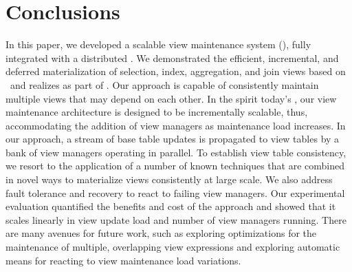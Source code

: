 \section{Conclusions}
\label{sec:conclusion}

In this paper, we developed a scalable view maintenance system (\VMS),
fully integrated with a distributed \KVS. We demonstrated the
efficient, incremental, and deferred materialization of selection,
index, aggregation, and join views based on \VMS\ and realizes as part
of \HB. Our approach is capable of consistently maintain multiple
views that may depend on each other.  In the spirit today's \KVSs, our
view maintenance architecture is designed to be incrementally
scalable, thus, accommodating the addition of view managers as
maintenance load increases. In our approach, a stream of base table
updates is propagated to view tables by a bank of view managers
operating in parallel. To establish view table consistency, we resort
to the application of a number of known techniques that are combined
in novel ways to materialize views consistently at large scale. We
also address fault tolerance and recovery to react to failing view
managers. Our experimental evaluation quantified the benefits and cost
of the approach and showed that it scales linearly in view update load
and number of view managers running. There are many avenues for future
work, such as exploring optimizations for the maintenance of multiple,
overlapping view expressions and exploring automatic means for
reacting to view maintenance load variations.
